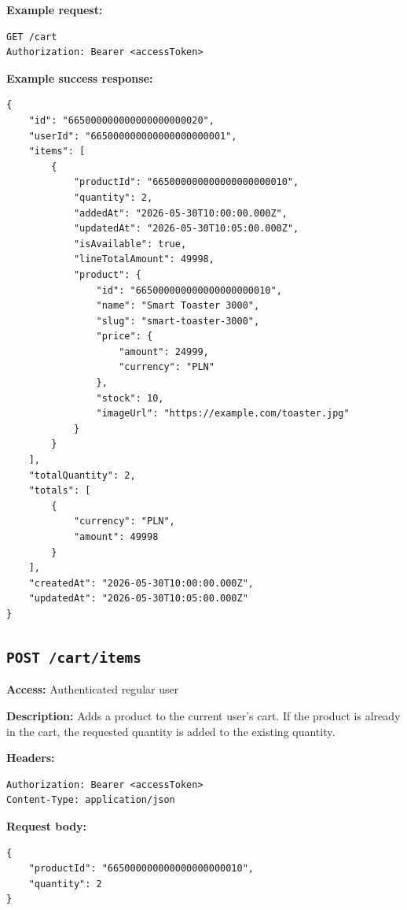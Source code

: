 \textbf{Example request:}

\begin{verbatim}
GET /cart
Authorization: Bearer <accessToken>
\end{verbatim}

\pagebreak
\textbf{Example success response:}

\begin{verbatim}
{
    "id": "665000000000000000000020",
    "userId": "665000000000000000000001",
    "items": [
        {
            "productId": "665000000000000000000010",
            "quantity": 2,
            "addedAt": "2026-05-30T10:00:00.000Z",
            "updatedAt": "2026-05-30T10:05:00.000Z",
            "isAvailable": true,
            "lineTotalAmount": 49998,
            "product": {
                "id": "665000000000000000000010",
                "name": "Smart Toaster 3000",
                "slug": "smart-toaster-3000",
                "price": {
                    "amount": 24999,
                    "currency": "PLN"
                },
                "stock": 10,
                "imageUrl": "https://example.com/toaster.jpg"
            }
        }
    ],
    "totalQuantity": 2,
    "totals": [
        {
            "currency": "PLN",
            "amount": 49998
        }
    ],
    "createdAt": "2026-05-30T10:00:00.000Z",
    "updatedAt": "2026-05-30T10:05:00.000Z"
}
\end{verbatim}

\subsection{\texttt{POST /cart/items}}

\textbf{Access:} Authenticated regular user

\textbf{Description:} Adds a product to the current user's cart. If the product is already in the cart, the requested quantity is added to the existing quantity.

\textbf{Headers:}

\begin{verbatim}
Authorization: Bearer <accessToken>
Content-Type: application/json
\end{verbatim}

\textbf{Request body:}

\begin{verbatim}
{
    "productId": "665000000000000000000010",
    "quantity": 2
}
\end{verbatim}

